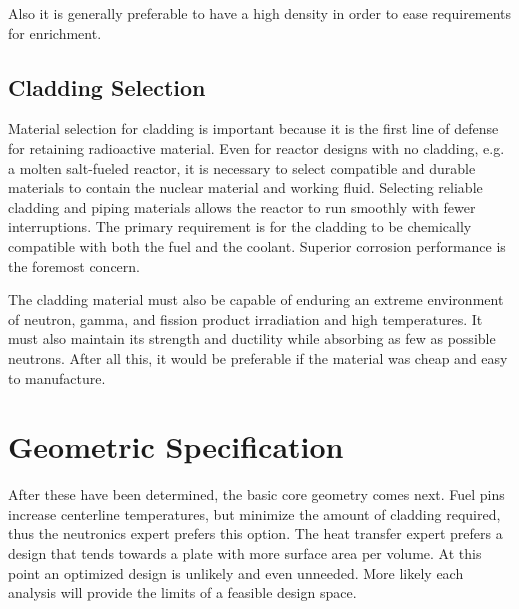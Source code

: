 Also it is generally preferable to have a high density in order to ease requirements for enrichment.

\subsection{Cladding Selection}
Material selection for cladding is important because it is the first line of defense for retaining radioactive material.
Even for reactor designs with no cladding, e.g. a molten salt-fueled reactor, it is necessary to select compatible and durable materials to contain the nuclear material and working fluid.
Selecting reliable cladding and piping materials allows the reactor to run smoothly with fewer interruptions. The primary requirement is for the cladding to be chemically compatible with both the fuel and the coolant. Superior corrosion performance is the foremost concern.

The cladding material must also be capable of enduring an extreme environment of neutron, gamma, and fission product irradiation and high temperatures. It must also maintain its strength and ductility while absorbing as few as possible neutrons. 
After all this, it would be preferable if the material was cheap and easy to manufacture.

\section{Geometric Specification}
After these have been determined, the basic core geometry comes next. Fuel pins increase centerline temperatures, but minimize the amount of cladding required, thus the neutronics expert prefers this option. The heat transfer expert prefers a design that tends towards a plate with more surface area per volume. 
At this point an optimized design is unlikely and even unneeded. More likely each analysis will provide the limits of a feasible design space. 




